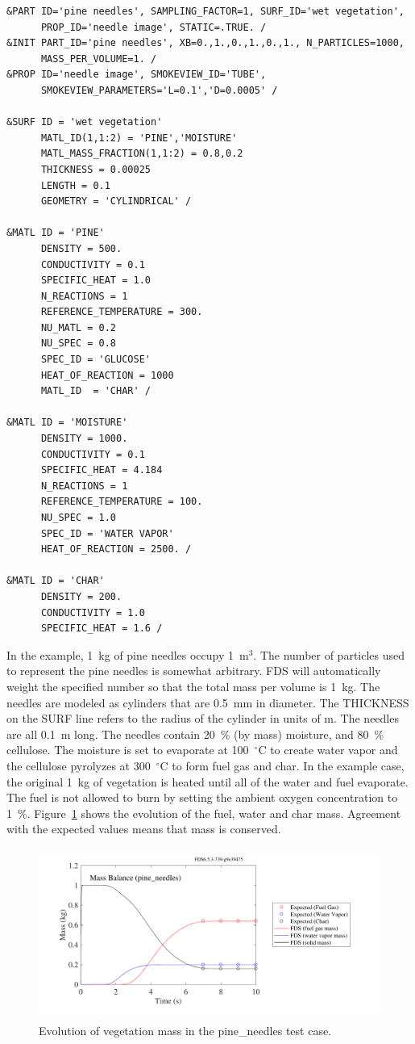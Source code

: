 \documentclass[11pt]{book}
\begin{document}
\begin{lstlisting}
&PART ID='pine needles', SAMPLING_FACTOR=1, SURF_ID='wet vegetation',
      PROP_ID='needle image', STATIC=.TRUE. /
&INIT PART_ID='pine needles', XB=0.,1.,0.,1.,0.,1., N_PARTICLES=1000,
      MASS_PER_VOLUME=1. /
&PROP ID='needle image', SMOKEVIEW_ID='TUBE',
      SMOKEVIEW_PARAMETERS='L=0.1','D=0.0005' /

&SURF ID = 'wet vegetation'
      MATL_ID(1,1:2) = 'PINE','MOISTURE'
      MATL_MASS_FRACTION(1,1:2) = 0.8,0.2
      THICKNESS = 0.00025
      LENGTH = 0.1
      GEOMETRY = 'CYLINDRICAL' /

&MATL ID = 'PINE'
      DENSITY = 500.
      CONDUCTIVITY = 0.1
      SPECIFIC_HEAT = 1.0
      N_REACTIONS = 1
      REFERENCE_TEMPERATURE = 300.
      NU_MATL = 0.2
      NU_SPEC = 0.8
      SPEC_ID = 'GLUCOSE'
      HEAT_OF_REACTION = 1000
      MATL_ID  = 'CHAR' /

&MATL ID = 'MOISTURE'
      DENSITY = 1000.
      CONDUCTIVITY = 0.1
      SPECIFIC_HEAT = 4.184
      N_REACTIONS = 1
      REFERENCE_TEMPERATURE = 100.
      NU_SPEC = 1.0
      SPEC_ID = 'WATER VAPOR'
      HEAT_OF_REACTION = 2500. /

&MATL ID = 'CHAR'
      DENSITY = 200.
      CONDUCTIVITY = 1.0
      SPECIFIC_HEAT = 1.6 /
\end{lstlisting}
In the example, 1~kg of pine needles occupy 1~m$^3$. The number of particles used to represent the pine needles is somewhat arbitrary. FDS will automatically weight the specified number so that the total mass per volume is 1~kg. The needles are modeled as cylinders that are 0.5~mm in diameter. The {\ct THICKNESS} on the {\ct SURF} line refers to the radius of the cylinder in units of m. The needles are all 0.1~m long. The needles contain 20~\% (by mass) moisture, and 80~\% cellulose. The moisture is set to evaporate at 100~$^\circ$C to create water vapor and the cellulose pyrolyzes at 300~$^\circ$C to form fuel gas and char. In the example case, the original 1~kg of vegetation is heated until all of the water and fuel evaporate. The fuel is not allowed to burn by setting the ambient oxygen concentration to 1~\%. Figure~\ref{pine_needles} shows the evolution of the fuel, water and char mass. Agreement with the expected values means that mass is conserved.

\begin{figure}[ht]
\begin{center}
\includegraphics[height=2.2in]{SCRIPT_FIGURES/pine_needles}
\end{center}
\caption[Example of burning vegetation]{Evolution of vegetation mass in the {\ct pine\_needles} test case.}
\label{pine_needles}
\end{figure}
\end{document}
